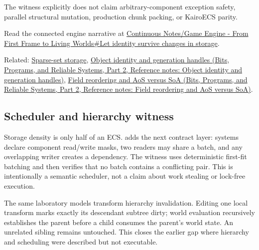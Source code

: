 The witness explicitly does not claim arbitrary-component exception safety, parallel structural mutation, production chunk packing, or KairoECS parity.

Read the connected engine narrative at \hyperref[05-engine-i-ch014-let-identity-survive-changes-in-storage]{Continuous Notes/Game Engine - From First Frame to Living Worlds\#Let identity survive changes in storage}.

Related: \hyperref[appendix-8404d0b1a3e7]{Sparse-set storage}, \href{../01-Bits-Programs-and-Reliable-Systems-P02/main.pdf\#appendix-f1581457d322}{Object identity and generation handles (Bits, Programs, and Reliable Systems, Part 2, Reference notes: Object identity and generation handles)}, \href{../01-Bits-Programs-and-Reliable-Systems-P02/main.pdf\#appendix-5522ad176ca0}{Field reordering and AoS versus SoA (Bits, Programs, and Reliable Systems, Part 2, Reference notes: Field reordering and AoS versus SoA)}.

\subsection{Scheduler and hierarchy witness}\label{appendix-fbfeb0430008-scheduler-and-hierarchy-witness}

\hypertarget{appendix-fbfeb0430008-scheduler-and-hierarchy-witness}{}

Storage density is only half of an ECS.  adds the next contract layer: systems declare component read/write masks, two readers may share a batch, and any overlapping writer creates a dependency. The witness uses deterministic first-fit batching and then verifies that no batch contains a conflicting pair. This is intentionally a semantic scheduler, not a claim about work stealing or lock-free execution.

The same laboratory models transform hierarchy invalidation. Editing one local transform marks exactly its descendant subtree dirty; world evaluation recursively establishes the parent before a child consumes the parent's world state. An unrelated sibling remains untouched. This closes the earlier gap where hierarchy and scheduling were described but not executable.
